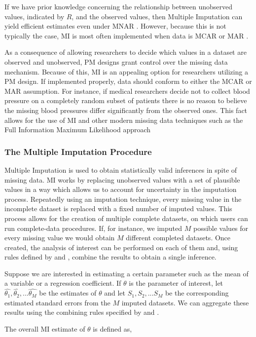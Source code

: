 \documentclass{svjour3}                     %
\begin{document}
If we have prior knowledge concerning the relationship between unobserved values, indicated by $R$, and the observed values, then Multiple Imputation can yield efficient estimates even under MNAR \citep{harel2007multiple}. However, because this is not typically the case, MI is most often implemented when data is MCAR or MAR \citep{little2014statistical}. \par

As a consequence of allowing researchers to decide which values in a dataset are observed and unobserved, PM designs grant control over the missing data mechanism. Because of this, MI is an appealing option for researchers utilizing a PM design. If implemented properly, data should conform to either the MCAR or MAR assumption. For instance, if medical researchers decide not to collect blood pressure on a completely random subset of patients there is no reason to believe the missing blood pressures differ significantly from the observed ones. This fact allows for the use of MI and other modern missing data techniques such as the Full Information Maximum Likelihood approach \citep{dempster1977maximum} \par

\subsubsection{The Multiple Imputation Procedure}
\label{sec:1.3.2}
Multiple Imputation is used to obtain statistically valid inferences in spite of missing data. MI works by replacing unobserved values with a set of plausible values in a way which allows us to account for uncertainty in the imputation process. Repeatedly using an imputation technique, every missing value in the incomplete dataset is replaced with a fixed number of imputed values. This process allows for the creation of multiple complete datasets, on which users can run complete-data procedures. If, for instance, we imputed $M$ possible values for every missing value we would obtain $M$ different completed datasets. Once created, the analysis of interest can be performed on each of them and, using rules defined by \citet{little2014statistical} and \citet{rubin2004multiple}, combine the results to obtain a single inference. \par

Suppose we are interested in estimating a certain parameter such as the mean of a variable or a regression coefficient. If $\theta$ is the parameter of interest, let $\widehat{\theta_1}, \widehat{\theta_2}, ... \widehat{\theta_M}$ be the estimates of $\theta$ and let $S_1, S_2, ... S_M$ be the corresponding estimated standard errors from the $M$ imputed datasets. We can aggregate these results using the combining rules specified by \citet{little2014statistical} and \citet{rubin2004multiple}. \par
The overall MI estimate of $\theta$ is defined as,
\end{document}
